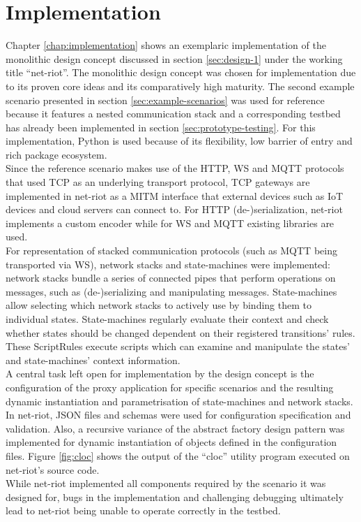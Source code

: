 \section{Implementation}
\label{sec:summary-implementation}
Chapter \ref{chap:implementation} shows an exemplaric implementation of the monolithic design concept discussed in section \ref{sec:design-1} under the working title \enquote{net-riot}. The monolithic design concept was chosen for implementation due to its proven core ideas and its comparatively high maturity. The second example scenario presented in section \ref{sec:example-scenarios} was used for reference because it features a nested communication stack and a corresponding testbed has already been implemented in section \ref{sec:prototype-testing}. For this implementation, Python is used because of its flexibility, low barrier of entry and rich package ecosystem.\\
Since the reference scenario makes use of the \ac{HTTP}, \ac{WS} and \ac{MQTT} protocols that used \ac{TCP} as an underlying transport protocol, \ac{TCP} gateways are implemented in net-riot as a \ac{MITM} interface that external devices such as \ac{IoT} devices and cloud servers can connect to. For \ac{HTTP} (de-)serialization, net-riot implements a custom encoder while for \ac{WS} and \ac{MQTT} existing libraries are used.\\
For representation of stacked communication protocols (such as \ac{MQTT} being transported via \ac{WS}), network stacks and state-machines were implemented: network stacks bundle a series of connected pipes that perform operations on messages, such as (de-)serializing and manipulating messages. State-machines allow selecting which network stacks to actively use by binding them to individual states. State-machines regularly evaluate their context and check whether states should be changed dependent on their registered transitions' rules. These ScriptRules execute scripts which can examine and manipulate the states' and state-machines' context information.\\
A central task left open for implementation by the design concept is the configuration of the proxy application for specific scenarios and the resulting dynamic instantiation and parametrisation of state-machines and network stacks. In net-riot, \ac{JSON} files and schemas were used for configuration specification and validation. Also, a recursive variance of the abstract factory design pattern was implemented for dynamic instantiation of objects defined in the configuration files. Figure \ref{fig:cloc} shows the output of the \enquote{cloc} utility program executed on net-riot's source code.\\
While net-riot implemented all components required by the scenario it was designed for, bugs in the implementation and challenging debugging ultimately lead to net-riot being unable to operate correctly in the testbed.

